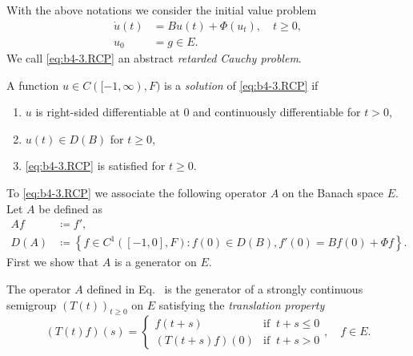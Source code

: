 With the above notations we consider the initial value problem
\begin{equation*}\label{eq:b4-3.RCP} \tag{RCP}
	\begin{split}
		\dot{u}(t) &= Bu(t) + \Phi(u_{t}), \quad t \geq 0, \\
		u_{0} &= g \in E.
	\end{split}
\end{equation*}
We call \eqref{eq:b4-3.RCP} an abstract \emph{retarded Cauchy problem}.

A function $u \in C([-1,\infty),F)$ is a \emph{solution} of \eqref{eq:b4-3.RCP} if
\begin{enumerate}[\upshape (i)]
	\item 
	$u$ is right-sided differentiable at 0 and continuously differentiable for $t  >  0$,
	
	\item 
	$u(t) \in D(B)$ for $t \geq 0$,
    
	\item 
	 \eqref{eq:b4-3.RCP} is satisfied for $t \geq 0$.
\end{enumerate}
To \eqref{eq:b4-3.RCP} we associate the following operator $A$ on the Banach space $E$.
Let $A$ be defined as
\begin{equation}\label{eq:b4-3.1}
	\begin{aligned}
		Af & \coloneq  f'  ,\\
		D(A) & \coloneq  \left\{f \in C^1([-1,0],F) \colon f(0) \in D(B), f'(0) = Bf(0) + \Phi f\right\} .
	\end{aligned}
\end{equation}
First we show that $A$ is a generator on $E$.
\begin{theorem}\label{thm:b4-3.1}
	The operator $A$ defined in Eq.~ is the generator of a strongly continuous semigroup $(T(t))_{t\geq 0}$ on $E$ satisfying the \emph{translation property}
\begin{equation*}\label{eq:b4-3.T} \tag{T}
    (T(t)f)(s) = 
    \begin{cases} 
        f(t+s) & \text{if } \ t+s \leq 0 \\
        (T(t+s)f)(0) & \text{if } \ t+s  >  0 
    \end{cases}, \quad f \in E .
\end{equation*}
\end{theorem}
